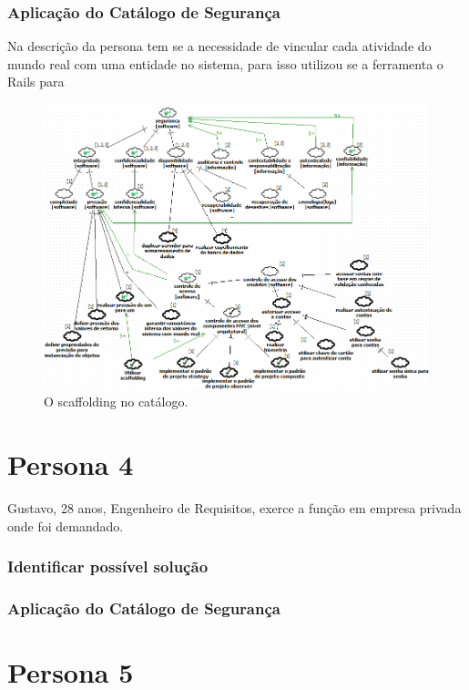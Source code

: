 \subsubsection{Aplicação do Catálogo de Segurança}

Na descrição da persona tem se a necessidade de vincular cada atividade do mundo real com uma entidade no sistema, para isso utilizou se a ferramenta o Rails para 

\begin{figure}[h!]
	\centering
	\includegraphics[keepaspectratio=true,scale=0.7]{figuras/catalogoPersona3.PNG}
	\caption{O scaffolding no catálogo.}
	\label{catalogoPersona3}
\end{figure}


\section{Persona 4}
\label{subsec:persona4}


Gustavo, 28 anos, Engenheiro de Requisitos, exerce a função em empresa privada onde foi demandado. 

\subsubsection{Identificar possível solução}

\subsubsection{Aplicação do Catálogo de Segurança}

\section{Persona 5}
\label{subsec:persona5}

